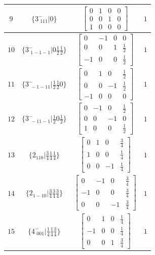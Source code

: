 \documentclass[fleqn,8pt]{jsarticle}
\begin{document}
\begin{longtable}{cccc}
$ 9 $ & $ \{3^{-}_{\,\,111}|0\} $ & $ \begin{bmatrix} 0 & 1 & 0 & 0 \\ 0 & 0 & 1 & 0 \\ 1 & 0 & 0 & 0 \end{bmatrix} $ & $ 1 $ \\ \hline
$ 10 $ & $ \{3^{-}_{\,\,1-1-1}|0 \frac{1}{2} \frac{1}{2}\} $ & $ \begin{bmatrix} 0 & -1 & 0 & 0 \\ 0 & 0 & 1 & \frac{1}{2} \\ -1 & 0 & 0 & \frac{1}{2} \end{bmatrix} $ & $ 1 $ \\ \hline
$ 11 $ & $ \{3^{-}_{\,\,-1-11}|\frac{1}{2} \frac{1}{2} 0\} $ & $ \begin{bmatrix} 0 & 1 & 0 & \frac{1}{2} \\ 0 & 0 & -1 & \frac{1}{2} \\ -1 & 0 & 0 & 0 \end{bmatrix} $ & $ 1 $ \\ \hline
$ 12 $ & $ \{3^{-}_{\,\,-11-1}|\frac{1}{2} 0 \frac{1}{2}\} $ & $ \begin{bmatrix} 0 & -1 & 0 & \frac{1}{2} \\ 0 & 0 & -1 & 0 \\ 1 & 0 & 0 & \frac{1}{2} \end{bmatrix} $ & $ 1 $ \\ \hline
$ 13 $ & $ \{2{}_{110}|\frac{3}{4} \frac{1}{4} \frac{1}{4}\} $ & $ \begin{bmatrix} 0 & 1 & 0 & \frac{3}{4} \\ 1 & 0 & 0 & \frac{1}{4} \\ 0 & 0 & -1 & \frac{1}{4} \end{bmatrix} $ & $ 1 $ \\ \hline
$ 14 $ & $ \{2{}_{1-10}|\frac{3}{4} \frac{3}{4} \frac{3}{4}\} $ & $ \begin{bmatrix} 0 & -1 & 0 & \frac{3}{4} \\ -1 & 0 & 0 & \frac{3}{4} \\ 0 & 0 & -1 & \frac{3}{4} \end{bmatrix} $ & $ 1 $ \\ \hline
$ 15 $ & $ \{4^{-}_{\,\,001}|\frac{1}{4} \frac{1}{4} \frac{3}{4}\} $ & $ \begin{bmatrix} 0 & 1 & 0 & \frac{1}{4} \\ -1 & 0 & 0 & \frac{1}{4} \\ 0 & 0 & 1 & \frac{3}{4} \end{bmatrix} $ & $ 1 $ \\ \hline

\end{longtable}
\end{document}
